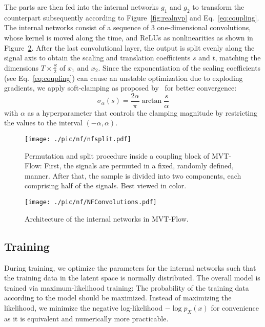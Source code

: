 \documentclass[journal]{IEEEtran}
\begin{document}
The parts are then fed into the internal networks $g_1$ and $g_2$ to transform the counterpart subsequently according to Figure~\ref{fig:realnvp} and Eq.~\ref{eq:coupling}.
The internal networks consist of a sequence of 3 one-dimensional convolutions, whose kernel is moved along the time, and ReLUs as nonlinearities as shown in Figure~\ref{fig:internal}.
After the last convolutional layer, the output is split evenly along the signal axis to obtain the scaling and translation coefficients $s$ and $t$, {matching the dimensions $T\times \frac{S}{2}$ of $x_1$ and $x_2$.}
Since the exponentiation of the scaling coefficients (see Eq.~\ref{eq:coupling}) can cause an unstable optimization due to exploding gradients, we apply soft-clamping as proposed by~\cite{cinn} for better convergence:
\begin{equation}
\sigma_{\alpha}(s) = \frac{2\alpha}{\pi}\arctan{\frac{s}{\alpha}}
\end{equation}
with $\alpha$ as a hyperparameter that controls the clamping magnitude by restricting the values to the interval $(-\alpha, \alpha)$.

\begin{figure}[]
    \centering
    \texttt{[image: ./pic/nf/nfsplit.pdf]}
    \caption{Permutation and split procedure inside a coupling block of MVT-Flow: First, the signals are permuted in a fixed, randomly defined, manner. After that, the sample is divided into two components, each comprising half of the signals. Best viewed in color.}
    \label{fig:nf_split}
    \vspace{-2mm}
\end{figure}

\begin{figure}[]
    \centering
    \texttt{[image: ./pic/nf/NFConvolutions.pdf]}
    \caption{Architecture of the internal networks in MVT-Flow.}
    \label{fig:internal}
    \vspace{-2mm}
\end{figure}

\subsection{Training}
\label{training}
During training, we optimize the parameters for the internal networks such that the training data in the latent space is normally distributed.
The overall model is trained via maximum-likelihood training:
The probability of the training data according to the model should be maximized.
Instead of maximizing the likelihood, we minimize the negative log-likelihood $- \log{p_X(x)}$ for convenience as it is equivalent and numerically more practicable.
\end{document}
